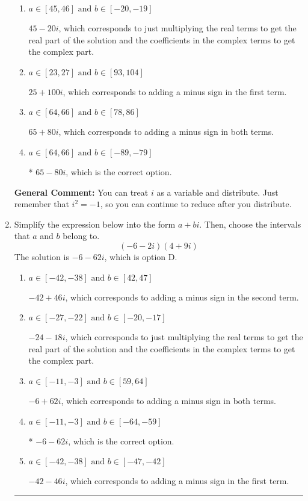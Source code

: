 \documentclass{extbook}[14pt]
\newcommand{\litem}[1]{\item #1

\rule{\textwidth}{0.4pt}}
\begin{document}
\begin{enumerate}
{\begin{enumerate}[label=\Alph*.]
 $25 - 100 i$, which corresponds to adding a minus sign in the second term.
\item \( a \in [45, 46] \text{ and } b \in [-20, -19] \)

 $45 - 20 i$, which corresponds to just multiplying the real terms to get the real part of the solution and the coefficients in the complex terms to get the complex part.
\item \( a \in [23, 27] \text{ and } b \in [93, 104] \)

 $25 + 100 i$, which corresponds to adding a minus sign in the first term.
\item \( a \in [64, 66] \text{ and } b \in [78, 86] \)

 $65 + 80 i$, which corresponds to adding a minus sign in both terms.
\item \( a \in [64, 66] \text{ and } b \in [-89, -79] \)

* $65 - 80 i$, which is the correct option.
\end{enumerate}

\textbf{General Comment:} You can treat $i$ as a variable and distribute. Just remember that $i^2=-1$, so you can continue to reduce after you distribute.
}
\litem{
Simplify the expression below into the form $a+bi$. Then, choose the intervals that $a$ and $b$ belong to.
\[ (-6 - 2 i)(4 + 9 i) \]The solution is \( -6 - 62 i \), which is option D.\begin{enumerate}[label=\Alph*.]
\item \( a \in [-42, -38] \text{ and } b \in [42, 47] \)

 $-42 + 46 i$, which corresponds to adding a minus sign in the second term.
\item \( a \in [-27, -22] \text{ and } b \in [-20, -17] \)

 $-24 - 18 i$, which corresponds to just multiplying the real terms to get the real part of the solution and the coefficients in the complex terms to get the complex part.
\item \( a \in [-11, -3] \text{ and } b \in [59, 64] \)

 $-6 + 62 i$, which corresponds to adding a minus sign in both terms.
\item \( a \in [-11, -3] \text{ and } b \in [-64, -59] \)

* $-6 - 62 i$, which is the correct option.
\item \( a \in [-42, -38] \text{ and } b \in [-47, -42] \)

 $-42 - 46 i$, which corresponds to adding a minus sign in the first term.
\end{enumerate}

}
\end{enumerate}
\end{document}
